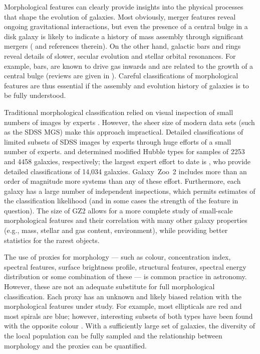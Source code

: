 \documentclass[useAMS,usenatbib]{mn2e}
\begin{document}
Morphological features can clearly provide insights into the physical processes that shape the evolution of galaxies. Most obviously, merger features reveal ongoing gravitational interactions, but even the presence of a central bulge in a disk galaxy is likely to indicate a history of mass assembly through significant mergers (\citealt{mar12} and references therein). On the other hand, galactic bars and rings reveal details of slower, secular evolution and stellar orbital resonances. For example, bars, are known to drive gas inwards and are related to the growth of a central bulge (reviews are given in \citealt{kor04,mas11c}). Careful classifications of morphological features are thus essential if the assembly and evolution history of galaxies is to be fully understood.

Traditional morphological classification relied on visual inspection of small numbers of images by experts \citep[e.g., ][]{san61,dev91}. However, the sheer size of modern data sets (such as the SDSS MGS) make this approach impractical. Detailed classifications of limited subsets of SDSS images by experts through huge efforts of a small number of experts. \citet{fuk07} and \citet{bai11} determined modified Hubble types for samples of 2253 and 4458 galaxies, respectively; the largest expert effort to date is \citet{nai10}, who provide detailed classifications of 14,034 galaxies. Galaxy~Zoo~2 includes more than an order of magnitude more systems than any of these effort. Furthermore, each galaxy has a large number of independent inspections, which permits estimates of the classification likelihood (and in some cases the strength of the feature in question). The size of GZ2 allows for a more complete study of small-scale morphological features and their correlation with many other galaxy properties (e.g., mass, stellar and gas content, environment), while providing better statistics for the rarest objects.

The use of proxies for morphology --- such as colour, concentration index, spectral features, surface brightness profile, structural features, spectral energy distribution or some combination of these --- is common practice in astronomy. However, these are not an adequate substitute for full morphological classification. Each proxy has an unknown and likely biased relation with the morphological features under study. For example, most ellipticals are red and most spirals are blue; however, interesting subsets of both types have been found with the opposite colour \citep{sch09,mas10a}. With a sufficiently large set of galaxies, the diversity of the local population can be fully sampled and the relationship between morphology and the proxies can be quantified.
\end{document}
